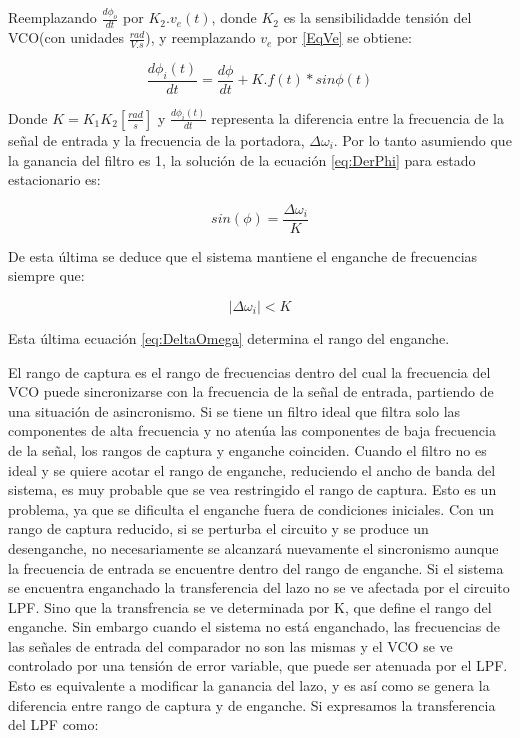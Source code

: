 Reemplazando $\frac{d\phi_o}{dt}$ por $K_2.v_e(t)$, donde $K_2$ es la sensibilidadde tensión del VCO(con unidades $\frac{rad}{V.s}$), y reemplazando $v_e$ por \ref{EqVe} se obtiene:

\begin{equation}
	\frac{d\phi_i(t)}{dt} = \frac{d\phi}{dt} +K.f(t)*sin\phi(t)
	\label{eq:DerPhi}
\end{equation}

Donde $K = K_1 K_2 [\frac{rad}{s}]$ y $\frac{d\phi_i(t)}{dt}$ representa la diferencia entre la frecuencia de la señal de entrada y la frecuencia de la portadora, $\Delta\omega_i$. Por lo tanto asumiendo que la ganancia del filtro es 1, la solución de la ecuación \ref{eq:DerPhi} para estado estacionario es:

\begin{equation}
	sin(\phi) = \frac{\Delta\omega_i}{K}
	\label{eq:SinPhi}
\end{equation}

De esta última se deduce que el sistema mantiene el enganche de frecuencias siempre que:

\begin{equation}
	|\Delta\omega_i|< K
	\label{eq:DeltaOmega}
\end{equation}

Esta última ecuación \ref{eq:DeltaOmega} determina el rango del enganche.

El rango de captura es el rango de frecuencias dentro del cual la frecuencia del VCO puede sincronizarse con la
frecuencia de la señal de entrada, partiendo de una situación de asincronismo. Si se tiene un filtro ideal que filtra solo las componentes de alta frecuencia y no atenúa las componentes de baja frecuencia de la señal, los rangos de captura y enganche coinciden. Cuando el filtro no es ideal y se quiere acotar el rango de enganche, reduciendo el ancho de banda del sistema, es muy probable que se vea restringido el rango de captura. Esto es un problema, ya que se dificulta el enganche fuera de condiciones iniciales. Con un rango de captura reducido, si se perturba el circuito y se produce un desenganche, no necesariamente se alcanzará nuevamente el sincronismo aunque la frecuencia de entrada se encuentre dentro del rango de enganche.
Si el sistema se encuentra enganchado la transferencia del lazo no se ve afectada por el circuito LPF. Sino que la transfrencia se ve determinada por K, que define el rango del enganche. Sin embargo cuando el sistema no está enganchado, las frecuencias de las señales de entrada del comparador no son las mismas y el VCO se ve controlado por una tensión de error variable, que puede ser atenuada por el LPF. Esto es equivalente a modificar la ganancia del lazo, y es así como se genera la diferencia entre rango de captura y de enganche. Si expresamos la transferencia del LPF como:

